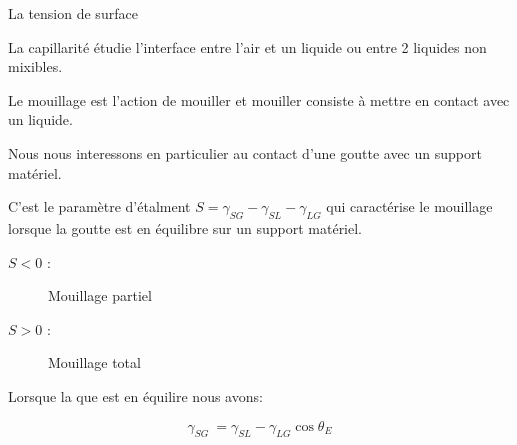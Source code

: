 
La tension de surface 

La capillarité étudie l'interface entre l'air et un liquide ou entre 2 liquides
non mixibles.

Le mouillage est l'action de mouiller et mouiller consiste à mettre en contact avec un liquide.

Nous nous interessons en particulier au contact d'une goutte avec un support matériel.

C'est le paramètre d'étalment $S = \gamma_{SG} - \gamma_{SL} - \gamma_{LG}$ qui caractérise le mouillage lorsque la goutte est en équilibre sur un support matériel.

\begin{description}
\item[$S < 0$ :] Mouillage partiel
\item[$S > 0$ :] Mouillage total
\end{description}

Lorsque la que est en équilire nous avons:

\[\gamma_{SG}\ = \gamma_{SL} - \gamma_{LG}\cos\theta_{E} \]
